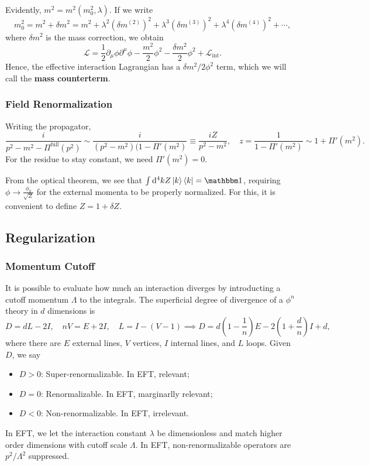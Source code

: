 \documentclass{article}
\begin{document}
Evidently, $m^2=m^2(m_0^2,\lambda)$. If we write 
$$m_0^2=m^2+\delta m^2=m^2+\lambda^2(\delta m^{(2)})^2+\lambda^3(\delta m^{(3)})^2+\lambda^4(\delta m^{(4)})^2+\cdots,$$
where $\delta m^2$ is the mass correction, we obtain 
$$\mathcal L=\frac 12\partial_\mu\phi\partial^\mu\phi-\frac{m^2}2\phi^2-\frac{\delta m^2}2\phi^2+\mathcal L_\text{int}.$$
Hence, the effective interaction Lagrangian has a $\delta m^2/2\phi^2$ term, which we will call the \textbf{mass counterterm}. 

\subsubsection{Field Renormalization}
Writing the propagator,
$$\frac i{p^2-m^2-\Pi^\text{full}(p^2)}\sim\frac i{(p^2-m^2)(1-\Pi'(m^2)}\equiv \frac{iZ}{p^2-m^2},\quad z=\frac{1}{1-\Pi'(m^2)}\sim 1+\Pi'(m^2).$$
For the residue to stay constant, we need $\Pi'(m^2)=0$.

From the optical theorem, we see that $\int \dd^4kZ\ket k\bra k=\mathbbm 1$, requiring $\phi\to\frac{\phi_0}{\sqrt Z}$ for the external momenta to be properly normalized. For this, it is convenient to define $Z=1+\delta Z$. 

\subsection{Regularization}
\subsubsection{Momentum Cutoff}
It is possible to evaluate how much an interaction diverges by introducting a cutoff momentum $\Lambda$ to the integrals. The superficial degree of divergence of a $\phi^n$ theory in $d$ dimensions is 
$$D=dL-2I,\quad nV=E+2I,\quad L=I-(V-1)\implies D=d\left(1-\frac 1n\right)E-2\left(1+\frac dn\right)I+d,$$
where there are $E$ external lines, $V$ vertices, $I$ internal lines, and $L$ loops. Given $D$, we say
\begin{itemize}
    \item $D>0$: Super-renormalizable. In EFT, relevant;
    \item $D=0$: Renormalizable. In EFT, marginarlly relevant;
    \item $D<0$: Non-renormalizable. In EFT, irrelevant.
\end{itemize}
In EFT, we let the interaction constant $\lambda$ be dimensionless and match higher order dimensions with cutoff scale $\Lambda$. In EFT, non-renormalizable operators are $p^2/\Lambda^2$ suppressed. 
\end{document}
